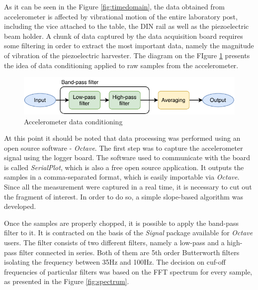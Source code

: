 \documentclass[12pt,a4paper]{article}
\begin{document}
As it can be seen in the Figure \ref{fig:timedomain}, the data obtained from accelerometer is affected by vibrational motion of the entire laboratory post, including the vice attached to the table, the DIN rail as well as the piezoelectric beam holder. A chunk of data captured by the data acquisition board requires some filtering in order to extract the most important data, namely the magnitude of vibration of the piezoelectric harvester. The diagram on the FIgure \ref{fig:accelsignal} presents the idea of data conditioning applied to raw samples from the accelerometer.

\begin{figure}[ht!]
\includegraphics[scale=1.0]{accelsignal.pdf}
\caption{Accelerometer data conditioning}
\label{fig:accelsignal}
\end{figure}



At this point it should be noted that data processing was performed using an open source software - \textit{Octave}. The first step was to capture the accelerometer signal using the logger board. The software used to communicate with the board is called \textit{SerialPlot}, which is also a free open source application. It outputs the samples in a comma-separated format, which is easily importable via \textit{Octave}. Since all the measurement were captured in a real time, it is necessary to cut out the fragment of interest. In order to do so, a simple slope-based algorithm was developed.
\par
Once the samples are properly chopped, it is possible to apply the band-pass filter to it. It is contracted on the basis of the \textit{Signal} package available for \textit{Octave} users. The filter consists of two different filters, namely a low-pass and a high-pass filter connected in series. Both of them are 5th order Butterworth filters isolating the frequency between 35Hz and 100Hz. The decision on cuf-off frequencies of particular filters was based on the FFT spectrum for every sample, as presented in the Figure \ref{fig:spectrum}.
\par
\end{document}
